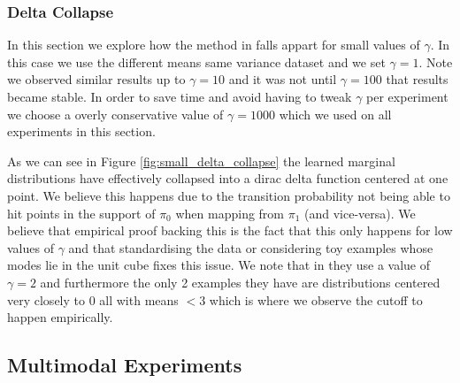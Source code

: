 \documentclass[a4paper,12pt,twoside,openright]{report}
\theoremstyle{definition}
\begin{document}
\subsubsection{Delta Collapse}
In this section we explore how the method in \cite{pavon2018data} falls appart for small values of $\gamma$. In this case we use the different means same variance dataset and we set $\gamma=1$. Note we observed similar results up to $\gamma=10$ and it was not until $\gamma=100$ that results became stable. In order to save time and avoid having to tweak $\gamma$ per experiment we choose a overly conservative value of $\gamma=1000$ which we used on all experiments in this section.

As we can see in Figure \ref{fig:small_delta_collapse} the learned marginal distributions have effectively collapsed into a dirac delta function centered at one point.  We believe this happens due to the transition probability not being able to hit points in the support of $\pi_0$ when mapping from $\pi_1$ (and vice-versa). We believe that empirical proof backing this is the fact that this only happens for low values of $\gamma$ and that standardising the data or considering toy examples whose modes lie in the unit cube fixes this issue. We note that in \cite{pavon2018data} they use a value of $\gamma=2$ and furthermore the only 2 examples they have are distributions centered very closely to 0 all with means $<3$ which is where we observe the cutoff to happen empirically. 
\subsection{Multimodal Experiments}
\end{document}
